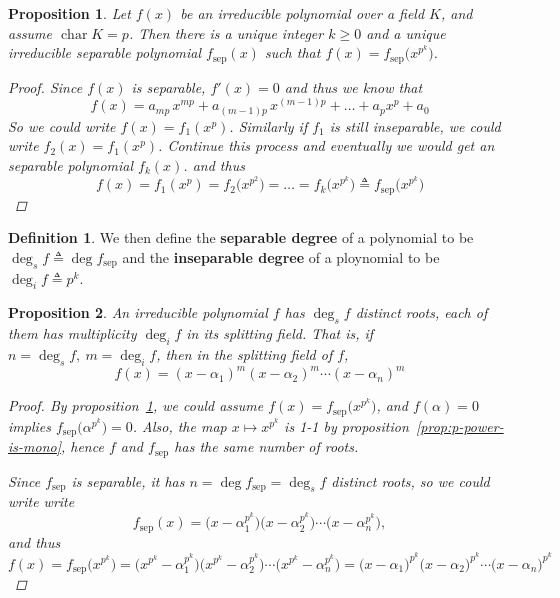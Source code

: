 \documentclass[a4paper]{article}
\newcommand{\defeq}{\triangleq}
\DeclareMathOperator{\Char}{char}
\theoremstyle{remark}
\theoremstyle{definition}
\theoremstyle{definition}
\newtheorem{definition}{Definition}
\theoremstyle{plain}
\newtheorem{proposition}{Proposition}
\begin{document}
  \begin{proposition} \label{prop:sep-polynomial}
    Let $f(x)$ be an irreducible polynomial over a field $K$, and assume $\Char K = p$.
    Then there is a unique integer $k \geq 0$ and a unique irreducible separable polynomial
    $f_{\text{sep}}(x)$ such that $f(x) = f_\text{sep}\big(x^{p^k}\big)$.

    \begin{proof}
      Since $f(x)$ is separable, $f'(x) = 0$ and thus we know that
      \[ f(x) = a_{mp} \, x^{mp}  + a_{(m-1)p} \, x^{(m-1)p} + \dots + a_p x^p + a_0 \]
      So we could write $f(x) = f_1(x^p)$. Similarly if $f_1$ is still inseparable, we could
      write $f_2(x) = f_1(x^p)$. Continue this process and eventually we would get an separable
      polynomial $f_k(x)$. and thus
      \[ f(x) = f_1(x^p) = f_2 \big( x^{p^2} \big) = \dots
        = f_k \big( x^{p^k} \big) \defeq f_\text{sep}\big( x^{p^k} \big) \]
    \end{proof}
  \end{proposition}

  \begin{definition}
    We then define the {\bf separable degree} of a polynomial to be $\deg_s f \defeq \deg f_\text{sep}$ and
    the {\bf inseparable degree} of a ploynomial to be $\deg_i f \defeq p^k$.
  \end{definition}

  \begin{proposition} \label{prop:multiplicity-insep}
    An irreducible polynomial $f$ has $\deg_s f$ distinct roots, each of them has multiplicity $\deg_i f$
    in its splitting field.
    That is, if $n = \deg_s f,\  m = \deg_i f$, then in the splitting field of $f$,
    \[ f(x) = (x - \alpha_1)^m (x - \alpha_2)^m \dotsm (x - \alpha_n)^m \]

    \begin{proof}
      By proposition~\ref{prop:sep-polynomial}, we could assume $f(x) = f_\text{sep}\big(x^{p^k}\big)$,
      and $f(\alpha) = 0$ implies $f_\text{sep}\big(\alpha^{p^k}\big) = 0$. Also, the map $x \mapsto x^{p^k}$
      is 1-1 by proposition~\ref{prop:p-power-is-mono}, hence $f$ and $f_\text{sep}$ has the same number of
      roots.

      Since $f_\text{sep}$ is separable, it has $n = \deg f_\text{sep} = \deg_s f$
      distinct roots, so we could write write
      \[ f_\text{sep}(x) =
        \big(x - \alpha_1^{p^k}\big) \big(x - \alpha_2^{p^k}\big) \dotsm \big(x - \alpha_n^{p^k}\big), \]
      and thus
      \[ f(x) = f_\text{sep}\big( x^{p^k} \big) =
        \Big(x^{p^k} - \alpha_1^{p^k}\Big) \Big(x^{p^k} - \alpha_2^{p^k}\Big) \dotsm \Big(x^{p^k}- \alpha_n^{p^k}\Big)
        = \big(x - \alpha_1\big)^{p^k} \big(x - \alpha_2\big)^{p^k} \dotsm \big(x - \alpha_n\big)^{p^k} \]

    \end{proof}
  \end{proposition}
\end{document}
